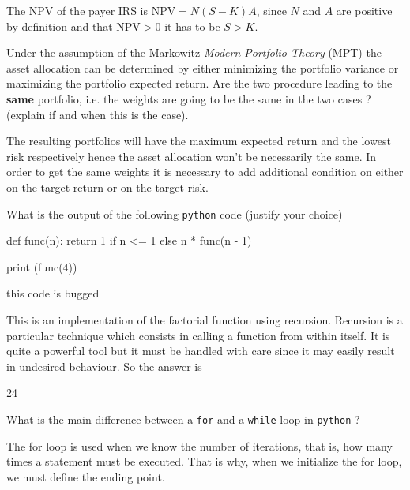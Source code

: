 \documentclass[12pt,a4paper]{exam}
\begin{document}
\begin{questions}
\fillwithlines{3cm}
\begin{solution}
The NPV of the payer IRS is $\text{NPV}=N(S-K)A$, since $N$ and $A$ are positive by definition and that $\text{NPV}>0$ it has to be $S>K$.
\end{solution}

\question
Under the assumption of the Markowitz \emph{Modern Portfolio Theory} (MPT) the asset allocation can be determined by either minimizing the portfolio variance or maximizing the portfolio expected return. Are the two procedure leading to the \textbf{same} portfolio, i.e. the weights are going to be the same in the two cases ? (explain if and when this is the case).
\fillwithlines{3cm}
\begin{solution}
The resulting portfolios will have the maximum expected return and the lowest risk respectively hence the asset allocation won't be necessarily the same. In order to get the same weights it is necessary to add additional condition on either on the target return or on the target risk.
\end{solution}

\question
What is the output of the following \texttt{python} code (justify your choice)

\begin{ipython}
def func(n):
    return 1 if n <= 1 else n * func(n - 1)

print (func(4))
\end{ipython}
\begin{checkboxes}
\choice this code is bugged
\end{checkboxes}
\fillwithlines{3cm}
\begin{solution}
This is an implementation of the factorial function using recursion. Recursion is a particular technique which consists in
calling a function from within itself. It is quite a powerful tool but it must be handled with care since it may easily result in
undesired behaviour. So the answer is
\begin{ioutput}
24
\end{ioutput}
\end{solution}

\question
What is the main difference between a \texttt{for} and a \texttt{while} loop in \texttt{python} ?

\fillwithlines{3cm}
\begin{solution}
The for loop is used when we know the number of iterations, that is, how many times a statement must be executed. That is why, when we initialize the for loop, we must define the ending point.


\end{solution}
\end{questions}
\end{document}
